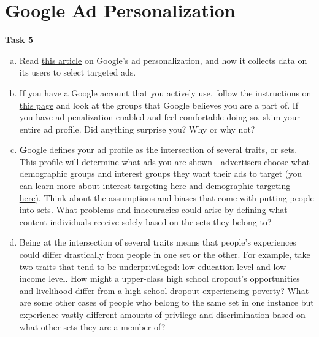 \documentclass[12pt,letterpaper]{article}
\begin{document}
\section*{Google Ad Personalization}
\textbf{Task 5}
 \begin{enumerate}[a.]
    \item Read \href{https://www.practicalecommerce.com/how-google-collects-data-to-personalize-ads}{this article} on Google's ad personalization, and how it collects data on its users to select targeted ads. 
    
    \item If you have a Google account that you actively use, follow the instructions on \href{https://www.businessinsider.com/what-does-google-know-about-me-search-history-delete-2019-10#first-navigate-to-your-google-account-homepage-by-clicking-the-widget-in-the-top-right-corner-of-any-google-site-1}{this page} and look at the groups that Google believes you are a part of. If you have ad penalization enabled and feel comfortable doing so, skim your entire ad profile. Did anything surprise you? Why or why not?
    
    \begin{mdframed} \vspace{2cm} \end{mdframed}
    
    \item 
    \textbf Google defines your ad profile as the intersection of several traits, or sets. This profile will determine what ads you are shown - advertisers choose what demographic groups and interest groups they want their ads to target (you can learn more about interest targeting \href{https://support.google.com/google-ads/answer/2497941}{here} and demographic targeting \href{https://support.google.com/google-ads/answer/2580383}{here}). Think about the assumptions and biases that come with putting people into sets. What problems and inaccuracies could arise by defining what content individuals receive solely based on the sets they belong to?
    
    \begin{mdframed} \vspace{4cm} \end{mdframed}
    
    \item Being at the intersection of several traits means that people's experiences could differ drastically from people in one set or the other. For example, take two traits that tend to be underprivileged: low education level and low income level. How might a upper-class high school dropout's opportunities and livelihood differ from a high school dropout experiencing poverty? What are some other cases of people who belong to the same set in one instance but experience vastly different amounts of privilege and discrimination based on what other sets they are a member of?
    

\end{enumerate}
\end{document}
